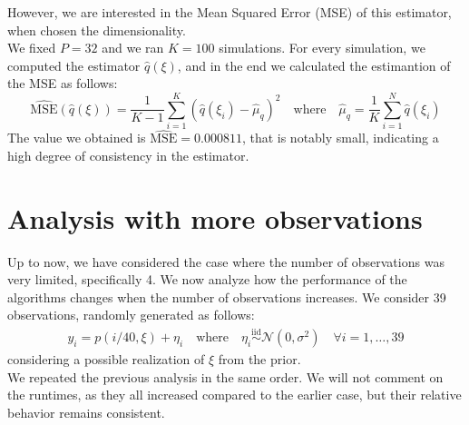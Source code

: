 \documentclass{article}
\begin{document}
However, we are interested in the Mean Squared Error (MSE) of this estimator, when chosen the dimensionality. \\
We fixed $P=32$ and we ran $K=100$ simulations. For every simulation, we computed the estimator $\hat{q}(\xi)$, and in the end we calculated the estimantion of the MSE as follows:
\begin{equation*}
    \hat{\text{MSE}}(\hat{q}(\xi)) = \frac{1}{K-1} \sum_{i=1}^{K}{(\hat{q}(\xi_i) - \hat{\mu}_{q})^2} \quad \text{where} \quad \hat{\mu}_{q} = \frac{1}{K} \sum_{i=1}^{N}{\hat{q}(\xi_i)}
\end{equation*}
The value we obtained is $\hat{\text{MSE}}= 0.000811$, that
is notably small, indicating a high degree of consistency in the estimator.

\section{Analysis with more observations}

Up to now, we have considered the case where the number of observations was very limited, specifically 4. We now analyze how the performance of the algorithms
changes when the number of observations increases. We consider 39 observations, randomly generated as follows:
\begin{gather*}
    y_i = p(i/40,\xi) + \eta_i \quad \text{where} \quad \eta_i \overset{\text{iid}}{\sim} \mathcal{N}(0,\sigma^2) \quad \forall i=1,\dots,39
\end{gather*}
considering a possible realization of $\xi$ from the prior. \\
We repeated the previous analysis in the same order. We will not comment on the runtimes, as they all increased compared 
to the earlier case, but their relative behavior remains consistent.\\
\end{document}

